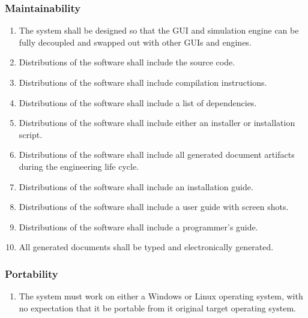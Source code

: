 \documentclass{scrartcl}
\begin{document}
\subsubsection{Maintainability}
\begin{enumerate}
\item The system shall be designed so that the GUI and simulation engine can be fully decoupled and swapped out with other GUIs and engines.

\item Distributions of the software shall include the source code.

\item Distributions of the software shall include compilation instructions.

\item Distributions of the software shall include a list of dependencies.

\item Distributions of the software shall include either an installer or installation script.

\item Distributions of the software shall include all generated document artifacts during the engineering life cycle.

\item Distributions of the software shall include an installation guide.

\item Distributions of the software shall include a user guide with screen shots.

\item  Distributions of the software shall include a programmer’s guide.

\item All generated documents shall be typed and electronically generated.

\end{enumerate}

\subsubsection{Portability}
\begin{enumerate}
\item The system must work on either a Windows or Linux operating system, with no expectation that it be portable from it original target operating system.

\end{enumerate}
\end{document}
